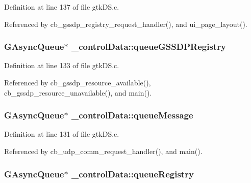 Definition at line 137 of file gtk\+D\+S.\+c.



Referenced by cb\+\_\+gssdp\+\_\+registry\+\_\+request\+\_\+handler(), and ui\+\_\+page\+\_\+layout().

\subsubsection[{\texorpdfstring{queue\+G\+S\+S\+D\+P\+Registry}{queueGSSDPRegistry}}]{\setlength{\rightskip}{0pt plus 5cm}G\+Async\+Queue$\ast$ \+\_\+control\+Data\+::queue\+G\+S\+S\+D\+P\+Registry}\hypertarget{struct__control_data_ad4c1f099018b51b0faeae870d284819d}{}\label{struct__control_data_ad4c1f099018b51b0faeae870d284819d}


Definition at line 133 of file gtk\+D\+S.\+c.



Referenced by cb\+\_\+gssdp\+\_\+resource\+\_\+available(), cb\+\_\+gssdp\+\_\+resource\+\_\+unavailable(), and main().

\subsubsection[{\texorpdfstring{queue\+Message}{queueMessage}}]{\setlength{\rightskip}{0pt plus 5cm}G\+Async\+Queue$\ast$ \+\_\+control\+Data\+::queue\+Message}\hypertarget{struct__control_data_adc74ddf3f6a7535eee87d39ed80ee7dd}{}\label{struct__control_data_adc74ddf3f6a7535eee87d39ed80ee7dd}


Definition at line 131 of file gtk\+D\+S.\+c.



Referenced by cb\+\_\+udp\+\_\+comm\+\_\+request\+\_\+handler(), and main().

\subsubsection[{\texorpdfstring{queue\+Registry}{queueRegistry}}]{\setlength{\rightskip}{0pt plus 5cm}G\+Async\+Queue$\ast$ \+\_\+control\+Data\+::queue\+Registry}\hypertarget{struct__control_data_a09b9467cd00be5a9ecac2386429ab65a}{}\label{struct__control_data_a09b9467cd00be5a9ecac2386429ab65a}


